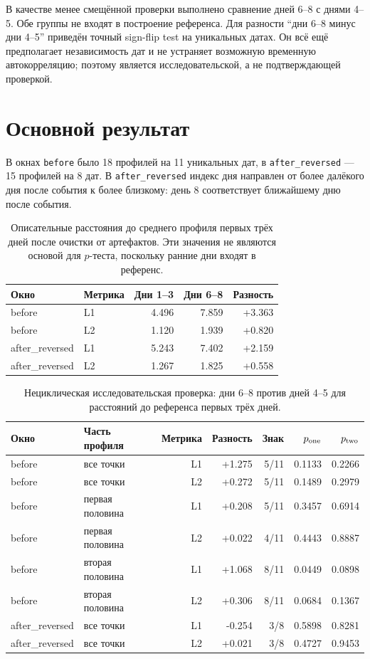 \documentclass[11pt,a4paper]{article}
\begin{document}
В качестве менее смещённой проверки выполнено сравнение дней 6--8 с днями
4--5. Обе группы не входят в построение референса. Для разности
``дни 6--8 минус дни 4--5'' приведён точный sign-flip test на уникальных
датах. Он всё ещё предполагает независимость дат и не устраняет возможную
временную автокорреляцию; поэтому является исследовательской, а не
подтверждающей проверкой.

\section{Основной результат}
В окнах \texttt{before} было 18 профилей на 11 уникальных дат, в
\texttt{after\_reversed} --- 15 профилей на 8 дат. В \texttt{after\_reversed}
индекс дня направлен от более далёкого дня после события к более близкому:
день 8 соответствует ближайшему дню после события.

\begin{table}[ht]
\centering
\caption{Описательные расстояния до среднего профиля первых трёх дней после
очистки от артефактов. Эти значения не являются основой для $p$-теста,
поскольку ранние дни входят в референс.}
\begin{tabular}{llrrr}
\toprule
Окно & Метрика & Дни 1--3 & Дни 6--8 & Разность \\
\midrule
before & L1 & 4.496 & 7.859 & +3.363 \\
before & L2 & 1.120 & 1.939 & +0.820 \\
after\_reversed & L1 & 5.243 & 7.402 & +2.159 \\
after\_reversed & L2 & 1.267 & 1.825 & +0.558 \\
\bottomrule
\end{tabular}
\end{table}

\begin{table}[ht]
\centering
\caption{Нециклическая исследовательская проверка: дни 6--8 против дней
4--5 для расстояний до референса первых трёх дней.}
\begin{tabular}{llrrrrr}
\toprule
Окно & Часть профиля & Метрика & Разность & Знак & $p_{\rm one}$ & $p_{\rm two}$ \\
\midrule
before & все точки & L1 & +1.275 & 5/11 & 0.1133 & 0.2266 \\
before & все точки & L2 & +0.272 & 5/11 & 0.1489 & 0.2979 \\
before & первая половина & L1 & +0.208 & 5/11 & 0.3457 & 0.6914 \\
before & первая половина & L2 & +0.022 & 4/11 & 0.4443 & 0.8887 \\
before & вторая половина & L1 & +1.068 & 8/11 & 0.0449 & 0.0898 \\
before & вторая половина & L2 & +0.306 & 8/11 & 0.0684 & 0.1367 \\
after\_reversed & все точки & L1 & -0.254 & 3/8 & 0.5898 & 0.8281 \\
after\_reversed & все точки & L2 & +0.021 & 3/8 & 0.4727 & 0.9453 \\
\bottomrule
\end{tabular}
\end{table}
\end{document}
